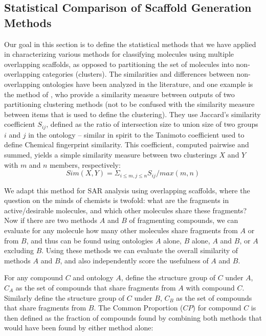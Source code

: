 \documentclass[journal=jacsat,manuscript=article]{achemso}
\begin{document}
\subsection{Statistical Comparison of Scaffold Generation Methods}
\label{sec:statmethod}
Our goal in this section is to define the statistical methods that we
have applied in characterizing various methods for classifying
molecules using multiple overlapping scaffolds, as opposed to
partitioning the set of molecules into non-overlapping categories
(clusters). The similarities and differences between non-overlapping
ontologies have been analyzed in the literature, and one example is
the method of \citeauthor{Torres2009}, who provide a similarity
measure between outputs of two partitioning clustering methods (not to
be confused with the similarity measure between items that is used to
define the clustering). They use Jaccard's similarity coefficient
$S_{ij}$, defined as the ratio of intersection size to union size of
two groups $i$ and $j$ in the ontology -- similar in spirit to the
Tanimoto coefficient used to define Chemical fingerprint similarity.
This coefficient, computed pairwise and summed, yields a simple
similarity measure between two clusterings $X$ and $Y$ with $m$ and
$n$ members, respectively:
\begin{equation}
Sim(X,Y) = \Sigma_{i \le m, j \le n}{S_{ij} / max(m,n)}
\end{equation}

We adapt this method for SAR analysis using overlapping scaffolds, where the question on the minds of chemists is twofold: what are the fragments in active/desirable molecules, and which other molecules share these fragments? Now if there are two methods $A$ and $B$ of fragmenting compounds, we can evaluate for any molecule how many other molecules share fragments from $A$ or from $B$, and thus can be found using ontologies $A$ alone, $B$ alone, $A$ and $B$, or $A$ excluding $B$.  Using these methods we can evaluate the overall similarity of methods $A$ and $B$, and also independently score the usefulness of $A$ and $B$.

For any compound $C$ and ontology $A$, define the structure group of $C$ under $A$, $C_A$ as the set of compounds that share fragments from $A$ with compound $C$. Similarly define the structure group of $C$ under $B$, $C_B$ as the set of compounds that share fragments from $B$. The Common Proportion ($CP$) for compound $C$ is then defined as the fraction of compounds found by combining both methods that would have been found by either method alone:
\end{document}
